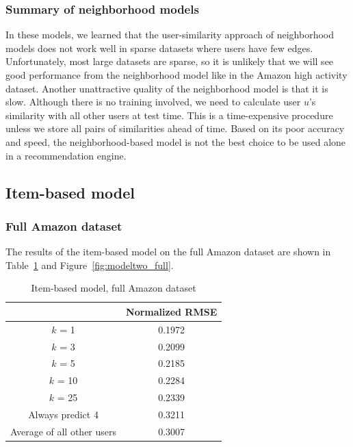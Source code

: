 \documentclass[letterpaper, 11 pt, conference]{ieeeconf}
\begin{document}
\subsubsection{Summary of neighborhood models}
In these models, we learned that the user-similarity approach of neighborhood 
models does not work well in sparse datasets where users have few edges. 
Unfortunately, most large datasets are sparse, so it is unlikely that we will 
see good performance from the neighborhood model like in the Amazon high 
activity dataset. Another unattractive quality of the neighborhood model is 
that it is slow. Although there is no training involved, we need to calculate 
user $u$'s similarity with all other users at test time. This is a 
time-expensive procedure unless we store all pairs of similarities 
ahead of time. Based on its poor accuracy and speed, the neighborhood-based 
model is not the best choice to be used alone in a recommendation engine.


\subsection{Item-based model}

\subsubsection{Full Amazon dataset}
The results of the item-based model on the full Amazon dataset 
are shown in Table~\ref{table:modeltwo_full} and Figure~\ref{fig:modeltwo_full}.

\begin{table}[htb]
\centering
\begin{tabular}{|c|c|}
\cline{2-2}

\multicolumn{1}{c|}{}  & {Normalized RMSE} \tabularnewline \hline
$k$ = 1 & 0.1972 \tabularnewline
$k$ = 3 & 0.2099 \tabularnewline
$k$ = 5 & 0.2185 \tabularnewline
$k$ = 10 & 0.2284 \tabularnewline
$k$ = 25 & 0.2339 \tabularnewline
\hline
Always predict 4 & 0.3211 \tabularnewline 
Average of all other users & 0.3007 \tabularnewline

\hline
\end{tabular}
\caption{Item-based model, full Amazon dataset}
\label{table:modeltwo_full}
\end{table}
\end{document}

